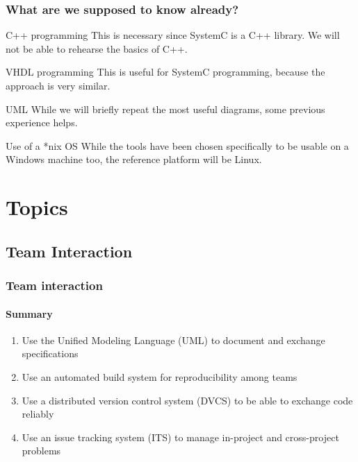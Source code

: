 \begin{frame}
\frametitle{What are we supposed to know already?}

\begin{block}{C++ programming}
This is necessary since SystemC is a C++ library. We will not be able to rehearse the basics of C++.
\end{block}
\begin{block}{VHDL programming}
This is useful for SystemC programming, because the approach is very similar.
\end{block}
\begin{block}{UML}
While we will briefly repeat the most useful diagrams, some previous experience helps.
\end{block}
\begin{block}{Use of a *nix OS}
While the tools have been chosen specifically to be usable on a Windows machine too, the reference platform will be Linux.
\end{block}

\end{frame}

\section{Topics}

\subsection{Team Interaction}

\begin{frame}
\frametitle{Team interaction}
\framesubtitle{Summary}
\begin{enumerate}
\item Use the Unified Modeling Language (UML) to document and exchange specifications
\item Use an automated build system for reproducibility among teams
\item Use a distributed version control system (DVCS) to be able to exchange code reliably
\item Use an issue tracking system (ITS) to manage in-project and cross-project problems
\end{enumerate}
\end{frame}

